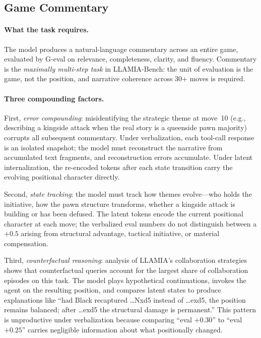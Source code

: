 \subsection{Game Commentary}
\label{sec:app_landscape_commentary}

\paragraph{What the task requires.}
The model produces a natural-language commentary across an entire game,
evaluated by G-eval on relevance, completeness, clarity, and fluency.
Commentary is the \emph{maximally multi-step task} in LLAMIA-Bench: the
unit of evaluation is the game, not the position, and narrative coherence
across 30+ moves is required.

\paragraph{Three compounding factors.}
First, \emph{error compounding}: misidentifying the strategic theme at
move~10 (e.g., describing a kingside attack when the real story is a
queenside pawn majority) corrupts all subsequent commentary.
Under verbalization, each tool-call response is an isolated snapshot; the
model must reconstruct the narrative from accumulated text fragments, and
reconstruction errors accumulate.
Under latent internalization, the re-encoded tokens after each state
transition carry the evolving positional character directly.

Second, \emph{state tracking}: the model must track how themes evolve---who
holds the initiative, how the pawn structure transforms, whether a
kingside attack is building or has been defused.
The latent tokens encode the current positional character at each move;
the verbalized eval numbers do not distinguish between a $+0.5$ arising
from structural advantage, tactical initiative, or material compensation.

Third, \emph{counterfactual reasoning}: analysis of LLAMIA's collaboration
strategies shows that counterfactual queries account for the largest share
of collaboration episodes on this task.
The model plays hypothetical continuations, invokes the agent on the
resulting position, and compares latent states to produce explanations
like ``had Black recaptured \ldots{}Nxd5 instead of \ldots{}exd5, the position
remains balanced; after \ldots{}exd5 the structural damage is permanent.''
This pattern is unproductive under verbalization because comparing
``eval $+0.30$'' to ``eval $+0.25$'' carries negligible information about
what positionally changed.

